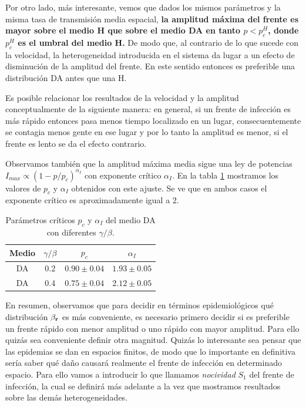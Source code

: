 Por otro lado, más interesante, vemos que dados los mismos parámetros y la misma tasa de transmisión media espacial, \textbf{la amplitud máxima del frente es mayor sobre el medio H que sobre el medio DA en tanto $p<p_c^H$, donde $p_c^H$ es el umbral del medio H.} De modo que, al contrario de lo que sucede con la velocidad, la heterogeneidad introducida en el sistema da lugar a un efecto de disminución de la amplitud del frente. En este sentido entonces es preferible una distribución DA antes que una H. 

Es posible relacionar los resultados de la velocidad y la amplitud conceptualmente de la siguiente manera: en general, si un frente de infección es más rápido entonces pasa menos tiempo localizado en un lugar, consecuentemente se contagia menos gente en ese lugar y por lo tanto la amplitud es menor, si el frente es lento se da el efecto contrario.

Observamos también que la amplitud máxima media sigue una ley de potencias $I_{max} \propto (1-p/p_c)^{\alpha_I}$ con exponente crítico $\alpha_I$. En la tabla \ref{tab:param_criticos_I} mostramos los valores de $p_c$ y $\alpha_I$ obtenidos con este ajuste. Se ve que en ambos casos el exponente crítico es aproximadamente igual a 2.


 \begin{table}[t]
    \centering
    \caption{Parámetros críticos $p_c$ y $\alpha_I$ del medio DA con diferentes $\gamma/\beta$.}
    \label{tab:param_criticos_I}
    \begin{tabular}{@{}cccc@{}}
    \toprule
    Medio & $\gamma/\beta$ & $p_c$         & $\alpha_I$    \\ \midrule
    DA    & 0.2            & $0.90\pm 0.04$ & $1.93 \pm 0.05$ \\
    DA    & 0.4            & $0.75\pm 0.04$ & $2.12 \pm 0.05$ \\ \bottomrule
    \end{tabular}
\end{table}

 En resumen, observamos que para decidir en términos epidemiológicos qué distribución $\beta_{\vb r}$ es más conveniente, es necesario primero decidir si es preferible un frente rápido con menor amplitud o uno rápido con mayor amplitud. Para ello quizás sea conveniente definir otra magnitud. Quizás lo interesante sea pensar que las epidemias se dan en espacios finitos, de modo que lo importante en definitiva sería saber qué daño causará realmente el frente de infección en determinado espacio. Para ello vamos a introducir lo que llamamos \textit{nocividad} $S_1$ del frente de infección, la cual se definirá más adelante a la vez que mostramos resultados sobre las demás heterogeneidades. 
 
